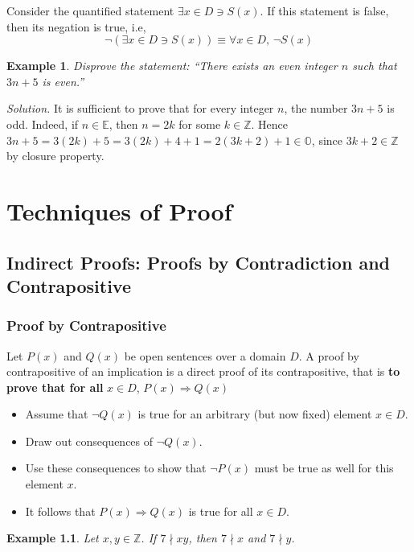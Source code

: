 \documentclass[10pt,reqno]{book}
\theoremstyle{plain}
\newtheorem{example}{Example}
\def\Z{\mathbb{Z}}
\def\E{\mathbb{E}}
\def\O{\mathbb{O}}
\begin{document}
	Consider the quantified statement $ \exists x \in D \ni S(x) $. If this statement is false, then its negation is true, i.e,
	\[ \neg (\exists x \in D \ni S(x)) \equiv \forall x \in D, \, \neg S(x) \]
	
	\begin{example}
		Disprove the statement: ``There exists an even integer $ n $ such that $ 3n+5 $ is even.''
	\end{example}
	\noindent \textit{Solution.} It is sufficient to prove that for every integer $ n $, the number $ 3n+5 $ is odd. Indeed, if $ n \in \E $, then $ n=2k $ for some $ k \in \Z $. Hence $ 3n+5 = 3(2k) + 5 = 3(2k) + 4 + 1 = 2(3k+2) + 1 \in \O $, since $ 3k+2 \in \Z $ by closure property.
	
	
	\chapter{Techniques of Proof}
	
	
	\section{Indirect Proofs: Proofs by Contradiction and Contrapositive}
	
	\subsection*{Proof by Contrapositive}

	Let $ P(x) $ and $ Q(x) $ be open sentences over a domain $ D $. A proof by contrapositive of an implication is a direct proof of its contrapositive, that is \textbf{to prove that for all} $ x \in D $, $ P(x) \Rightarrow Q(x) $
	\begin{itemize}
		\item Assume that $ \neg Q(x) $ is true for an arbitrary (but now fixed) element $ x \in D $.
		\item Draw out consequences of $ \neg Q(x) $.
		\item Use these consequences to show that $ \neg P(x) $ must be true as well for this element $ x $.
		\item It follows that $ P(x) \Rightarrow Q(x) $ is true for all $ x \in D $.\\
	\end{itemize}

	\begin{example}
		Let $ x,y \in \Z $. If $ 7 \nmid xy $, then $ 7 \nmid x $ and $ 7 \nmid y $.
	\end{example}
\end{document}

